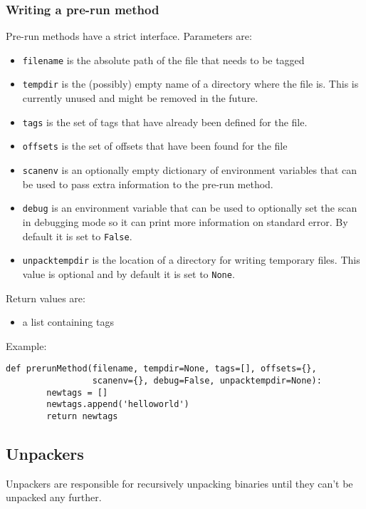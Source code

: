\documentclass[10pt,a4paper]{article}
\begin{document}
\subsubsection{Writing a pre-run method}

Pre-run methods have a strict interface. Parameters are:

\begin{itemize}
\item \texttt{filename} is the absolute path of the file that needs to be tagged
\item \texttt{tempdir} is the (possibly) empty name of a directory where the
file is. This is currently unused and might be removed in the future.
\item \texttt{tags} is the set of tags that have already been defined for the
file.
\item \texttt{offsets} is the set of offsets that have been found for the file
\item \texttt{scanenv} is an optionally empty dictionary of environment variables
that can be used to pass extra information to the pre-run method.
\item \texttt{debug} is an environment variable that can be used to optionally
set the scan in debugging mode so it can print more information on standard
error. By default it is set to \texttt{False}.
\item \texttt{unpacktempdir} is the location of a directory for writing
temporary files. This value is optional and by default it is set to
\texttt{None}.
\end{itemize}

Return values are:

\begin{itemize}
\item a list containing tags
\end{itemize}

Example:

\begin{verbatim}
def prerunMethod(filename, tempdir=None, tags=[], offsets={},
                 scanenv={}, debug=False, unpacktempdir=None):
        newtags = []
        newtags.append('helloworld')
        return newtags
\end{verbatim}

\subsection{Unpackers}

Unpackers are responsible for recursively unpacking binaries until they
can't be unpacked any further.
\end{document}
